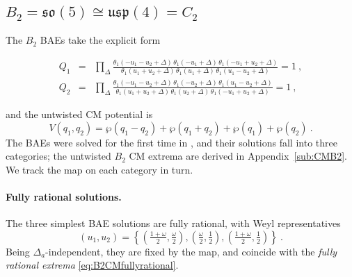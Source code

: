 \documentclass[aps, prx, nofootinbib, twocolumn,amsfonts,amsmath,amssymb,mathtools,superscriptaddress,preprintnumbers,floatfix,reprint]{revtex4-2}
\begin{document}
\subsection{\texorpdfstring{$B_2 =\mathfrak{so}(5)\cong \mathfrak{usp}(4)= C_2$}{B2=so(5)=usp(4)=C2}}
\label{sub:B2}

The $B_2$ BAEs take the explicit form
\begin{widetext}
\begin{subequations}\label{eq:BAE_B2}
\begin{eqnarray}
  Q_1&=&\prod_{\Delta}\frac{\theta_1(-u_1-u_2+\Delta)\,\theta_1(-u_1+\Delta)\,
  \theta_1(-u_1+u_2+\Delta)}
  {\theta_1(u_1+u_2+\Delta)\,\theta_1(u_1+\Delta)\,\theta_1(u_1-u_2+\Delta)}=1\ ,\\
  Q_2&=&\prod_{\Delta}\frac{\theta_1(-u_1-u_2+\Delta)\,\theta_1(-u_2+\Delta)\,
  \theta_1(u_1-u_2+\Delta)}
  {\theta_1(u_1+u_2+\Delta)\,\theta_1(u_2+\Delta)\,\theta_1(-u_1+u_2+\Delta)}=1\ ,
\end{eqnarray}
\end{subequations}
\end{widetext}
and the untwisted CM potential is
\begin{equation}\label{eq:B2pot}
  V(q_1,q_2)=\wp(q_1-q_2)+\wp(q_1+q_2)+\wp(q_1)+\wp(q_2)\ .
\end{equation}
The BAEs were solved for the first time in \cite{B2paper}, and their solutions fall into three
categories; the untwisted $B_2$ CM extrema are derived in
Appendix~\ref{sub:CMB2}. We track the map on each category in turn.

\paragraph{Fully rational solutions.}
The three simplest BAE solutions are fully rational, with Weyl representatives
\begin{equation}\label{eq:B2fullyrat}
  (u_1,u_2) = \left\{\left(\tfrac{1+\omega}{2},\tfrac{\omega}{2}\right),
  \left(\tfrac{\omega}{2},\tfrac12\right),
  \left(\tfrac{1+\omega}{2},\tfrac12\right)\right\}\ .
\end{equation}
Being $\Delta_a$-independent, they are fixed by the map, and coincide with the
\emph{fully rational extrema} \eqref{eq:B2CMfullyrational}.
\end{document}
